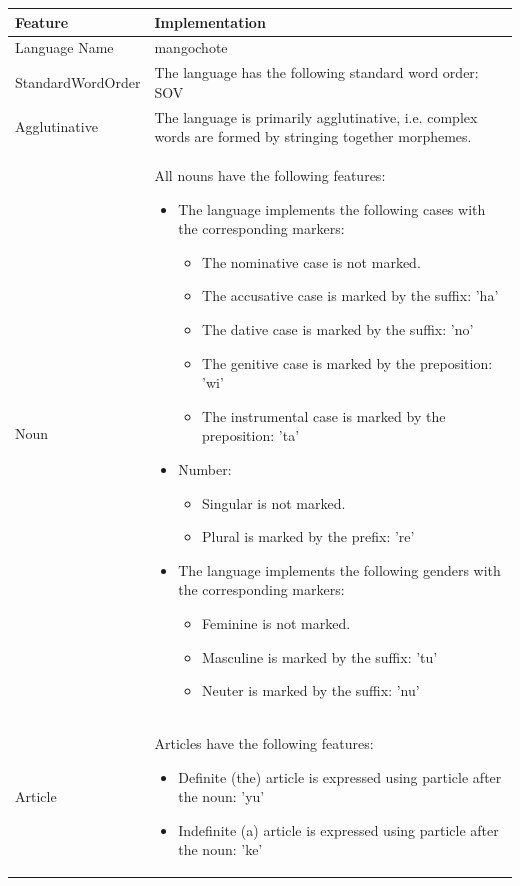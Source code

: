 \begin{longtable}{|l|p{10cm}|}
\hline
\textbf{Feature} & \textbf{Implementation} \\
\hline
\endhead

Language Name & mangochote \\
\hline

StandardWordOrder & The language has the following standard word order: SOV \\
\hline

Agglutinative & The language is primarily agglutinative, i.e. complex words are formed by stringing together morphemes. \\
\hline

Noun & All nouns have the following features:
\begin{itemize}
    \item The language implements the following cases with the corresponding markers:
    \begin{itemize}
        \item The nominative case is not marked.
        \item The accusative case is marked by the suffix: 'ha'
        \item The dative case is marked by the suffix: 'no'
        \item The genitive case is marked by the preposition: 'wi'
        \item The instrumental case is marked by the preposition: 'ta'
    \end{itemize}
    \item Number:
    \begin{itemize}
        \item Singular is not marked.
        \item Plural is marked by the prefix: 're'
    \end{itemize}
    \item The language implements the following genders with the corresponding markers:
    \begin{itemize}
        \item Feminine is not marked.
        \item Masculine is marked by the suffix: 'tu'
        \item Neuter is marked by the suffix: 'nu'
    \end{itemize}
\end{itemize} \\
\hline

Article & Articles have the following features:
\begin{itemize}
    \item Definite (the) article is expressed using particle after the noun: 'yu'
    \item Indefinite (a) article is expressed using particle after the noun: 'ke'
\end{itemize} \\
\hline


\end{longtable}
